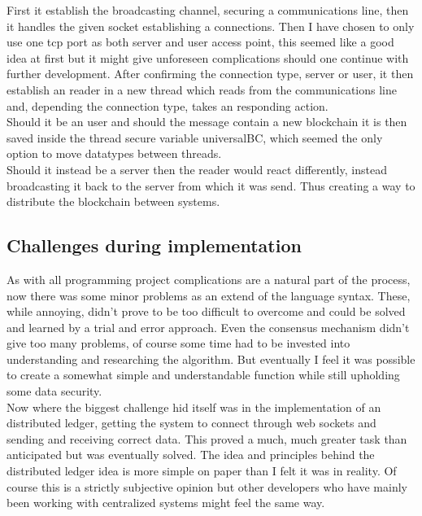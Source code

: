 \documentclass[paper=a4, fontsize=11pt]{scrartcl} %
\numberwithin{equation}{section} %
\numberwithin{figure}{section} %
\numberwithin{table}{section} %
\begin{document}
First it establish the broadcasting channel, securing a communications line, then it handles the given socket establishing a connections. Then I have chosen to only use one tcp port as both server and user access point, this seemed like a good idea at first but it might give unforeseen complications should one continue with further development. After confirming the connection type, server or user, it then establish an reader in a new thread which reads from the communications line and, depending the connection type, takes an responding action.\\

Should it be an user and should the message contain a new blockchain it is then saved inside the thread secure variable universalBC, which seemed the only option to move datatypes between threads.\\

Should it instead be a server then the reader would react differently, instead broadcasting it back to the server from which it was send. Thus creating a way to distribute the blockchain between systems.


\subsection{Challenges during implementation}

As with all programming project complications are a natural part of the process, now there was some minor problems as an extend of the language syntax. These, while annoying, didn't prove to be too difficult to overcome and could be solved and learned by a trial and error approach.
Even the consensus mechanism didn't give too many problems, of course some time had to be invested into understanding and researching the algorithm. But eventually I feel it was possible to create a somewhat simple and understandable function while still upholding some data security.\\

Now where the biggest challenge hid itself was in the implementation of an distributed ledger, getting the system to connect through web sockets  and sending and receiving correct data. This proved a much, much greater task than anticipated but was eventually solved. The idea and principles behind the distributed ledger idea is more simple on paper than I felt it was in reality. Of course this is a strictly subjective opinion but other developers who have mainly been working with centralized systems might feel the same way. 
\end{document}
